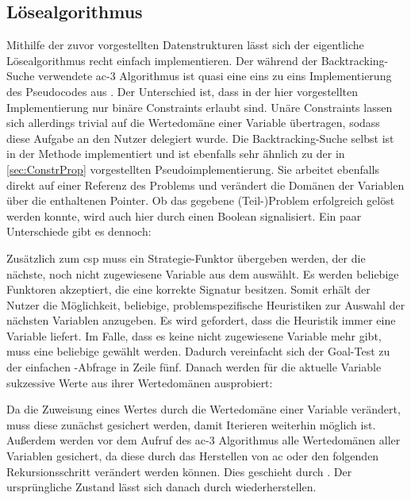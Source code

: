 \subsection{Lösealgorithmus}
Mithilfe der zuvor vorgestellten Datenstrukturen lässt sich der eigentliche Lösealgorithmus recht einfach implementieren. Der während der Backtracking-Suche verwendete \ac*{ac}-3
Algorithmus ist quasi eine eins zu eins Implementierung des Pseudocodes aus \cite{ac3}. Der Unterschied ist, dass in der hier vorgestellten Implementierung nur binäre Constraints
erlaubt sind. Unäre Constraints lassen sich allerdings trivial auf die Wertedomäne einer Variable übertragen, sodass diese Aufgabe an den Nutzer delegiert wurde.
Die Backtracking-Suche selbst ist in der Methode  implementiert und ist ebenfalls sehr ähnlich zu der in \cref{sec:ConstrProp} vorgestellten
Pseudoimplementierung. Sie arbeitet ebenfalls direkt auf einer Referenz des Problems und verändert die Domänen der Variablen über die enthaltenen Pointer. Ob das gegebene
(Teil-)Problem erfolgreich gelöst werden konnte, wird auch hier durch einen Boolean signalisiert. Ein paar Unterschiede gibt es dennoch:

Zusätzlich zum \ac*{csp} muss ein Strategie-Funktor übergeben werden, der die nächste, noch nicht zugewiesene Variable aus dem  auswählt. Es werden beliebige
Funktoren akzeptiert, die eine korrekte Signatur besitzen. Somit erhält der Nutzer die Möglichkeit, beliebige, problemspezifische Heuristiken zur Auswahl der nächsten Variablen
anzugeben. Es wird gefordert, dass die Heuristik immer eine Variable liefert. Im Falle, dass es keine nicht zugewiesene Variable mehr gibt, muss eine beliebige gewählt werden.
Dadurch vereinfacht sich der Goal-Test zu der einfachen -Abfrage in Zeile fünf. Danach werden für die aktuelle Variable sukzessive Werte aus ihrer Wertedomänen
ausprobiert:

Da die Zuweisung eines Wertes durch  die Wertedomäne einer Variable verändert, muss diese zunächst gesichert werden, damit Iterieren weiterhin möglich ist.
Außerdem werden vor dem Aufruf des \ac*{ac}-3 Algorithmus alle Wertedomänen aller Variablen gesichert, da diese durch das Herstellen von \ac*{ac} oder den folgenden
Rekursionsschritt verändert werden können. Dies geschieht durch . Der ursprüngliche Zustand lässt sich danach durch
 wiederherstellen.

